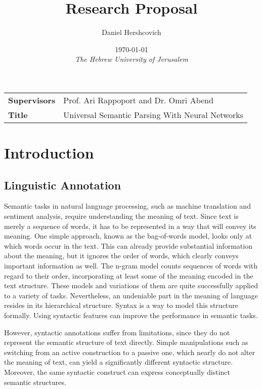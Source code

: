 \documentclass[11pt]{article}
\title{Research Proposal}
\author{Daniel Hershcovich}
\date{\today \\ \textit{The Hebrew University of Jerusalem}}
\begin{document}
\maketitle

\begin{table}[!th]
\begin{tabular}{>{\bfseries}l p{}}
Supervisors & Prof. Ari Rappoport and Dr. Omri Abend \\
Title & Universal Semantic Parsing With Neural Networks
\end{tabular}
\end{table}


\section{Introduction}\label{sec:introduction}

\subsection{Linguistic Annotation}

Semantic tasks in natural language processing, such as machine translation and
sentiment analysis, require understanding the meaning of text. Since text is
merely a sequence of words, it has to be represented in a way that will convey
its meaning. One simple approach, known as the bag-of-words model, looks only
at which words occur in the text. This can already provide
substantial information about the meaning, but it ignores the order of words,
which clearly conveys important information as well. The n-gram model counts
sequences of words with regard to their order, incorporating at least some of
the meaning encoded in the text structure. These models and variations of them
are quite successfully applied to a variety of
tasks\cite{mikolov2013efficient}. Nevertheless, an undeniable part in the
meaning of language resides in its hierarchical structure. Syntax is a way to
model this structure formally. Using syntactic features can improve the
performance in semantic tasks\cite{vandeghinste2013parse}.

However, syntactic annotations suffer from limitations, since they do not
represent the semantic structure of text directly. Simple manipulations such as
switching from an active construction to a passive one, which nearly do not
alter the meaning of text, can yield a significantly different syntactic
structure. Moreover, the same syntactic construct can express conceptually
distinct semantic structures\cite{abend2013ucca}.
\end{document}
